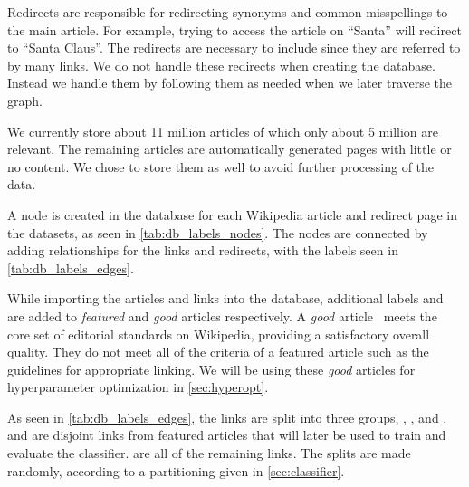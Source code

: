 Redirects are responsible for redirecting synonyms and common misspellings to the main article. For example, trying to access the article on ``Santa'' will redirect to ``Santa Claus''. The redirects are necessary to include since they are referred to by many links. We do not handle these redirects when creating the database. Instead we handle them by following them as needed when we later traverse the graph.

We currently store about 11 million articles of which only about 5 million are relevant. The remaining articles are automatically generated pages with little or no content. We chose to store them as well to avoid further processing of the data.

A node is created in the database for each Wikipedia article and redirect page in the datasets, as seen in \cref{tab:db_labels_nodes}. The nodes are connected by adding relationships for the links and redirects, with the labels seen in \cref{tab:db_labels_edges}.


While importing the articles and links into the database, additional labels  and  are added to \emph{featured} and \emph{good} articles respectively. A \emph{good} article~\cite{wiki-good-articles} meets the core set of editorial standards on Wikipedia, providing a satisfactory overall quality. They do not meet all of the criteria of a featured article such as the guidelines for appropriate linking. We will be using these \emph{good} articles for hyperparameter optimization in \cref{sec:hyperopt}.

As seen in \cref{tab:db_labels_edges}, the links are split into three groups, , , and .  and  are disjoint links from featured articles that will later be used to train and evaluate the classifier.  are all of the remaining links. The splits are made randomly, according to a partitioning given in \cref{sec:classifier}.

